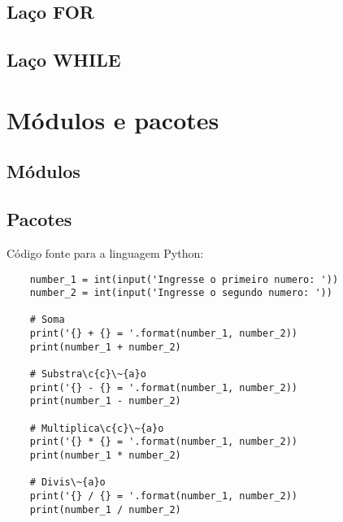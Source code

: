             \subsection{Laço FOR}

            \subsection{Laço WHILE}


    \section{Módulos e pacotes}



            \subsection{Módulos}



            \subsection{Pacotes}






    Código fonte para a linguagem Python:
    \begin{lstlisting}
    number_1 = int(input('Ingresse o primeiro numero: '))
    number_2 = int(input('Ingresse o segundo numero: '))

    # Soma
    print('{} + {} = '.format(number_1, number_2))
    print(number_1 + number_2)

    # Substra\c{c}\~{a}o
    print('{} - {} = '.format(number_1, number_2))
    print(number_1 - number_2)

    # Multiplica\c{c}\~{a}o
    print('{} * {} = '.format(number_1, number_2))
    print(number_1 * number_2)

    # Divis\~{a}o
    print('{} / {} = '.format(number_1, number_2))
    print(number_1 / number_2)
    \end{lstlisting}






